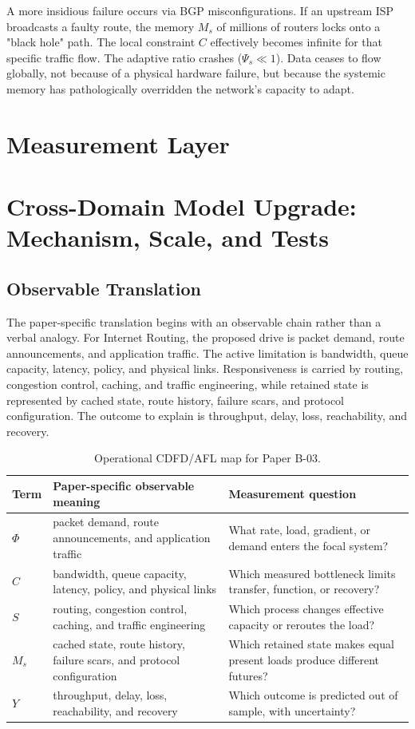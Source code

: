 \documentclass[11pt,a4paper]{article}
\begin{document}
A more insidious failure occurs via BGP misconfigurations. If an upstream ISP broadcasts a faulty route, the memory $M_s$ of millions of routers locks onto a "black hole" path. The local constraint $C$ effectively becomes infinite for that specific traffic flow. The adaptive ratio crashes ($\Psi_s \ll 1$). Data ceases to flow globally, not because of a physical hardware failure, but because the systemic memory has pathologically overridden the network's capacity to adapt.



\section{Measurement Layer}

\section{Cross-Domain Model Upgrade: Mechanism, Scale, and Tests}

\subsection{Observable Translation}

The paper-specific translation begins with an observable chain rather than a
verbal analogy. For Internet Routing, the proposed drive is packet demand, route announcements, and application traffic.
The active limitation is bandwidth, queue capacity, latency, policy, and physical links. Responsiveness is carried by
routing, congestion control, caching, and traffic engineering, while retained state is represented by
cached state, route history, failure scars, and protocol configuration. The outcome to explain is throughput, delay, loss, reachability, and recovery.

\begin{table}[htbp]
\centering
\small
\caption{Operational CDFD/AFL map for Paper B-03.}
\begin{tabularx}{\textwidth}{|l|X|X|}
\hline
\textbf{Term} & \textbf{Paper-specific observable meaning} & \textbf{Measurement question} \\
\hline
$\Phi$ & packet demand, route announcements, and application traffic & What rate, load, gradient, or demand enters the focal system? \\
\hline
$C$ & bandwidth, queue capacity, latency, policy, and physical links & Which measured bottleneck limits transfer, function, or recovery? \\
\hline
$S$ & routing, congestion control, caching, and traffic engineering & Which process changes effective capacity or reroutes the load? \\
\hline
$M_s$ & cached state, route history, failure scars, and protocol configuration & Which retained state makes equal present loads produce different futures? \\
\hline
$Y$ & throughput, delay, loss, reachability, and recovery & Which outcome is predicted out of sample, with uncertainty? \\
\hline
\end{tabularx}
\end{table}
\end{document}
